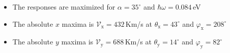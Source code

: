 \documentclass{beamer}
\begin{document}
\begin{frame}
\begin{columns}
\begin{center}
\begin{figure}[h!]
\begin{tikzpicture}
\end{tikzpicture}
\end{figure}

{\small

\vspace{-2mm}
\begin{itemize}

\item The responses are maximized for $\alpha = 35^{\circ}$ and $\hbar \omega =
0.084$\,eV
\item The absolute $x$ maxima is 
$\mathcal{V}_{\mathrm{x}} = 432$\,Km/s at
$\theta_{\mathrm{x}} = 43^{\circ}$ and
$\varphi_{\mathrm{x}} = 208^{\circ}$

\item The absolute $y$ maxima is 
$\mathcal{V}_{\mathrm{y}} = 688$\,Km/s at 
$\theta_{\mathrm{y}} =14^{\circ}$ and
$\varphi_{\mathrm{y}} = 82^{\circ}$

\end{itemize}

}


\end{center}


\end{columns}

\end{frame}

\end{document}
